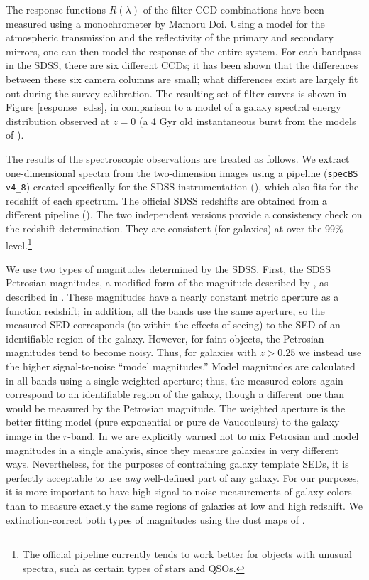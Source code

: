 \documentclass[10pt,preprint]{aastex}
\begin{document}
The response functions $R(\lambda)$ of the filter-CCD combinations
have been measured using a monochrometer by Mamoru Doi.  Using a model
for the atmospheric transmission and the reflectivity of the primary
and secondary mirrors, one can then model the response of the entire
system. For each bandpass in the SDSS, there are six different CCDs;
it has been shown that the differences between these six camera
columns are small; what differences exist are largely fit out during
the survey calibration. The resulting set of filter curves is shown in
Figure \ref{response_sdss}, in comparison to a model of a galaxy
spectral energy distribution observed at $z=0$ (a 4 Gyr old
instantaneous burst from the models of \citealt{bruzual93a}).

The results of the spectroscopic observations are treated as follows.
We extract one-dimensional spectra from the two-dimension images using
a pipeline ({\tt specBS v4\_8}) created specifically for the SDSS
instrumentation (\citealt{schlegel02a}), which also fits for the
redshift of each spectrum. The official SDSS redshifts are obtained
from a different pipeline (\citealt{subbarao02a}). The two independent
versions provide a consistency check on the redshift
determination. They are consistent (for galaxies) at over the 99\%
level.\footnote{The official pipeline currently tends to work better
for objects with unusual spectra, such as certain types of stars and
QSOs.}

We use two types of magnitudes determined by the SDSS. First, the SDSS
Petrosian magnitudes, a modified form of the magnitude described by
\citet{petrosian76a}, as described in \citet{strauss02a}.  These
magnitudes have a nearly constant metric aperture as a function
redshift; in addition, all the bands use the same aperture, so the
measured SED corresponds (to within the effects of seeing) to the SED
of an identifiable region of the galaxy. However, for faint objects,
the Petrosian magnitudes tend to become noisy. Thus, for galaxies with
$z>0.25$ we instead use the higher signal-to-noise ``model
magnitudes.'' Model magnitudes are calculated in all bands using a
single weighted aperture; thus, the measured colors again correspond
to an identifiable region of the galaxy, though a different one than
would be measured by the Petrosian magnitude. The weighted aperture is
the better fitting model (pure exponential or pure de Vaucouleurs) to
the galaxy image in the $r$-band. In \citet{stoughton02a} we are
explicitly warned not to mix Petrosian and model magnitudes in a
single analysis, since they measure galaxies in very different
ways. Nevertheless, for the purposes of contraining galaxy template
SEDs, it is perfectly acceptable to use {\it any} well-defined part of
any galaxy.  For our purposes, it is more important to have high
signal-to-noise measurements of galaxy colors than to measure exactly
the same regions of galaxies at low and high redshift.  We
extinction-correct both types of magnitudes using the dust maps of
\citet{schlegel98a}.
\end{document}
